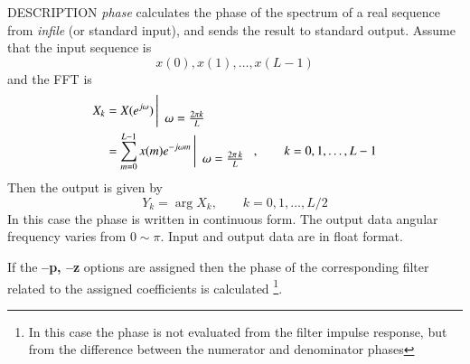 \begin{synopsis}
\item[phase] [ --l $L$ ] [ --p {\em pfile} ] [ --z {\em zfile} ]
             [ --m $M$ ] [ --n $N$ ] [ {\em infile} ]
\end{synopsis}

\begin{qsection}{DESCRIPTION}
{\em phase} calculates the phase of the spectrum of a real sequence 
from {\em infile} (or standard input), 
and sends the result to standard output.
Assume that the input sequence is
\begin{displaymath}
  x(0), x(1), \dots, x(L-1)
\end{displaymath}
and the FFT is
\begin{align}
  X_k &= X(e^{j\omega}) \left|
	\begin{array}{c}
	\\
        \omega=\frac{2\pi k}{L}
	\end{array}
    \right. \notag \\
         &= \sum_{m=0}^{L-1}x(m)e^{-j\omega m} \left|
	\begin{array}{c}
	\\
        \omega=\frac{2\pi\, k}{L}
	\end{array}
    \right.,\qquad k=0,1,\dots,L-1 \notag
\end{align}
Then the output is given by
\begin{displaymath}
  Y_k=\arg X_k, \qquad k=0,1,\dots,L/2
\end{displaymath}
In this case the phase is written in continuous form.
The output data angular frequency varies from $0\sim \pi$.
Input and output data are in float format.
\par
If the {\bf --p, --z} options are assigned
then the phase of the corresponding filter related to
the assigned coefficients is calculated
\footnote{
In this case the phase is not evaluated from the filter
impulse response, but from
the difference between the numerator and denominator phases}.
\end{qsection}

